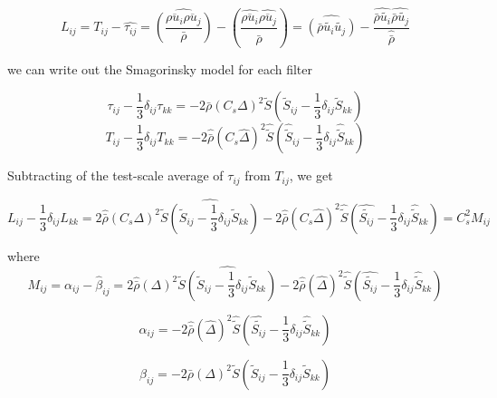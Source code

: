 \documentclass[12pt,titlepage]{article}
\begin{document}
\begin{displaymath}
L_{ij}=T_{ij} - \hat{\tau_{ij}} = \widehat{(\frac{\overline{\rho u_i} \overline{\rho
u_j}}{\bar{\rho}})}-(\frac{\widehat{\overline{\rho u_i}} \widehat{\overline{\rho
u_j}}}{\hat{\bar{\rho}}})
=\widehat{(\bar{\rho}\tilde{u_i}\tilde{u_j})}-\frac{\widehat{\bar{\rho}\tilde{u_i}}
 \widehat{\bar{\rho}\tilde{u_j}}}{\hat{\bar{\rho}}}
\end{displaymath}

we can write out the Smagorinsky model for each filter

\begin{displaymath}
\tau_{ij}-\frac{1}{3} \delta_{ij}\tau_{kk}= - 2 \bar{\rho}(C_s \Delta)^2\tilde{S}
(\tilde{S}_{ij}-\frac{1}{3} \delta_{ij}\tilde{S}_{kk})
\end{displaymath}
\begin{displaymath}
T_{ij}-\frac{1}{3} \delta_{ij}T_{kk}= - 2\hat{\bar{\rho}}(C_s \hat{\Delta})^2
\hat{\tilde{S}} (\hat{\tilde{S}}_{ij}-\frac{1}{3} \delta_{ij}\hat{\tilde{S}}_{kk})
\end{displaymath}

Subtracting of the test-scale average of $\tau_{ij}$ from $T_{ij}$, we get

\begin{equation}
L_{ij} - \frac{1}{3} \delta_{ij}L_{kk} = 2 \hat{\bar{\rho}}(C_s
\Delta)^2\widehat{\tilde{S} (\tilde{S}_{ij}-\frac{1}{3} \delta_{ij}\tilde{S}_{kk})}
-2\hat{\bar{\rho}}(C_s\hat{\Delta})^2\hat{\tilde{S}} (\hat{\tilde{S_{ij}}}-\frac{1}{3}
\delta_{ij}\hat{\tilde{S}}_{kk}) = C_s^2M_{ij}
\label{eq:lij}
\end{equation}

where
\begin{displaymath}
M_{ij} =\alpha_{ij}-\hat{\beta}_{ij} = 2\hat{\bar{\rho}}(\Delta)^2\widehat{\tilde{S}
(\tilde{S}_{ij}-\frac{1}{3} \delta_{ij}\tilde{S}_{kk})}
-2\hat{\bar{\rho}}(\hat{\Delta})^2\hat{\tilde{S}} (\hat{\tilde{S_{ij}}}-\frac{1}{3}
\delta_{ij}\hat{\tilde{S}}_{kk})
\end{displaymath}

\begin{displaymath}
\alpha_{ij}=-2\hat{\bar{\rho}}(\hat{\Delta})^2\hat{\tilde{S}}
(\hat{\tilde{S_{ij}}}-\frac{1}{3} \delta_{ij}\hat{\tilde{S}}_{kk})
\end{displaymath}

\begin{displaymath}
\beta_{ij}=-2 \bar{\rho}(\Delta)^2\tilde{S}
(\tilde{S}_{ij}-\frac{1}{3} \delta_{ij}\tilde{S}_{kk})
\end{displaymath}
\end{document}
